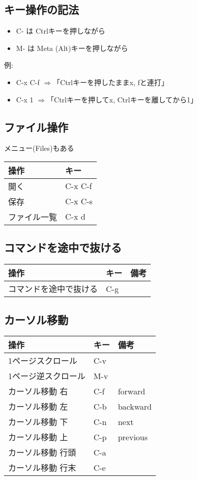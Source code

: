 \documentclass[landscape,7pt,dvipdfmx]{article}
\begin{document}
\begin{multicols*}{3}
{\subsection{キー操作の記法}
\begin{itemize}
\item C- は Ctrlキーを押しながら
\item M- は Meta (Alt)キーを押しながら
\end{itemize}
例:
\begin{itemize}
\item C-x C-f $\Rightarrow$「Ctrlキーを押したままx, fと連打」
\item C-x 1 $\Rightarrow$「Ctrlキーを押してx, Ctrlキーを離してから1」
\end{itemize}

\subsection{ファイル操作}
メニュー(Files)もある

\begin{tabular}{|l|l|}\hline
操作 & キー          \\\hline
開く & C-x C-f       \\
保存 & C-x C-s       \\\hline
ファイル一覧 & C-x d \\\hline
\end{tabular}

\subsection{コマンドを途中で抜ける}
\begin{tabular}{|l|l|l|}\hline
操作 & キー & 備考 \\\hline
コマンドを途中で抜ける & C-g & \\\hline
\end{tabular}

\subsection{カーソル移動}

\begin{tabular}{|l|l|l|}\hline
操作 & キー & 備考 \\\hline
1ページスクロール & C-v &  \\
1ページ逆スクロール & M-v &  \\
カーソル移動 右 &C-f &forward \\
カーソル移動 左 &C-b &backward \\
カーソル移動 下 &C-n &next \\
カーソル移動 上 &C-p &previous \\
カーソル移動 行頭 &C-a & \\
カーソル移動 行末 &C-e & \\\hline
\end{tabular}

}
\end{multicols*}
\end{document}
